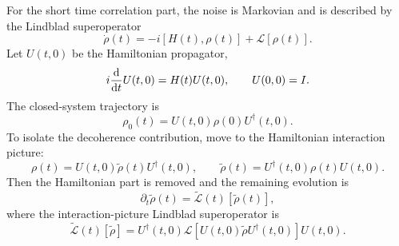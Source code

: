 \documentclass{simple-notes}
\begin{document}
For the short time correlation part, the noise is Markovian and is described
by the Lindblad superoperator
\begin{equation}
    \dot{\rho}(t)
    =
    -i[H(t),\rho(t)]
    +
    \mathcal{L}[\rho(t)] .
    \label{eq:lindblad_master_for_decoherence}
\end{equation}
Let $U(t,0)$ be the Hamiltonian propagator,
\begin{equation}
    i\dv{}{t}U(t,0) = H(t)U(t,0),
    \qquad
    U(0,0)=I.
\end{equation}
The closed-system trajectory is
\begin{equation}
    \rho_0(t)
    =
    U(t,0)\rho(0)U^\dagger(t,0).
\end{equation}
To isolate the decoherence contribution, move to the Hamiltonian interaction
picture:
\begin{equation}
    \rho(t)
    =
    U(t,0)\widetilde{\rho}(t)U^\dagger(t,0),
    \qquad
    \widetilde{\rho}(t)
    =
    U^\dagger(t,0)\rho(t)U(t,0).
\end{equation}
Then the Hamiltonian part is removed and the remaining evolution is
\begin{equation}
    \partial_t\widetilde{\rho}(t)
    =
    \widetilde{\mathcal{L}}(t)[\widetilde{\rho}(t)],
\end{equation}
where the interaction-picture Lindblad superoperator is
\begin{equation}
    \widetilde{\mathcal{L}}(t)[\widetilde{\rho}]
    =
    U^\dagger(t,0)
    \mathcal{L}\!\left[
        U(t,0)\widetilde{\rho}U^\dagger(t,0)
    \right]
    U(t,0).
\end{equation}
\end{document}
